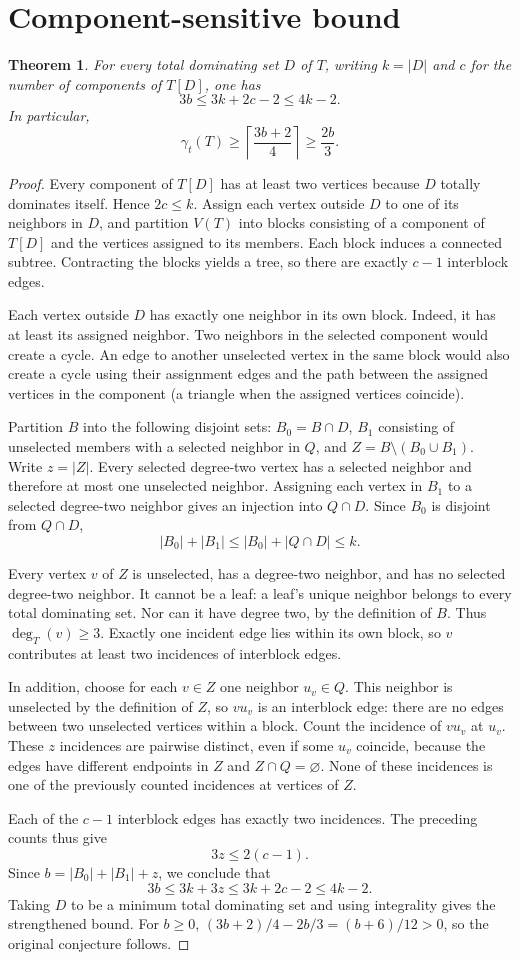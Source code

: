 \documentclass[11pt]{article}
\newtheorem{theorem}{Theorem}
\begin{document}
\section{Component-sensitive bound}
\begin{theorem}
For every total dominating set $D$ of $T$, writing $k=|D|$ and $c$ for the number of components of $T[D]$, one has
\[
 3b\le 3k+2c-2\le 4k-2.
\]
In particular,
\[
 \gamma_t(T)\ge \left\lceil\frac{3b+2}{4}\right\rceil
 \ge \frac{2b}{3}.
\]
\end{theorem}
\begin{proof}
Every component of $T[D]$ has at least two vertices because $D$ totally dominates itself. Hence $2c\le k$. Assign each vertex outside $D$ to one of its neighbors in $D$, and partition $V(T)$ into blocks consisting of a component of $T[D]$ and the vertices assigned to its members. Each block induces a connected subtree. Contracting the blocks yields a tree, so there are exactly $c-1$ interblock edges.

Each vertex outside $D$ has exactly one neighbor in its own block. Indeed, it has at least its assigned neighbor. Two neighbors in the selected component would create a cycle. An edge to another unselected vertex in the same block would also create a cycle using their assignment edges and the path between the assigned vertices in the component (a triangle when the assigned vertices coincide).

Partition $B$ into the following disjoint sets: $B_0=B\cap D$, $B_1$ consisting of unselected members with a selected neighbor in $Q$, and $Z=B\setminus(B_0\cup B_1)$. Write $z=|Z|$. Every selected degree-two vertex has a selected neighbor and therefore at most one unselected neighbor. Assigning each vertex in $B_1$ to a selected degree-two neighbor gives an injection into $Q\cap D$. Since $B_0$ is disjoint from $Q\cap D$,
\[
 |B_0|+|B_1|\le |B_0|+|Q\cap D|\le k.
\]

Every vertex $v$ of $Z$ is unselected, has a degree-two neighbor, and has no selected degree-two neighbor. It cannot be a leaf: a leaf's unique neighbor belongs to every total dominating set. Nor can it have degree two, by the definition of $B$. Thus $\deg_T(v)\ge3$. Exactly one incident edge lies within its own block, so $v$ contributes at least two incidences of interblock edges.

In addition, choose for each $v\in Z$ one neighbor $u_v\in Q$. This neighbor is unselected by the definition of $Z$, so $vu_v$ is an interblock edge: there are no edges between two unselected vertices within a block. Count the incidence of $vu_v$ at $u_v$. These $z$ incidences are pairwise distinct, even if some $u_v$ coincide, because the edges have different endpoints in $Z$ and $Z\cap Q=\varnothing$. None of these incidences is one of the previously counted incidences at vertices of $Z$.

Each of the $c-1$ interblock edges has exactly two incidences. The preceding counts thus give
\[
 3z\le 2(c-1).
\]
Since $b=|B_0|+|B_1|+z$, we conclude that
\[
 3b\le 3k+3z\le 3k+2c-2\le 4k-2.
\]
Taking $D$ to be a minimum total dominating set and using integrality gives the strengthened bound. For $b\ge0$, $(3b+2)/4-2b/3=(b+6)/12>0$, so the original conjecture follows.
\end{proof}
\end{document}
